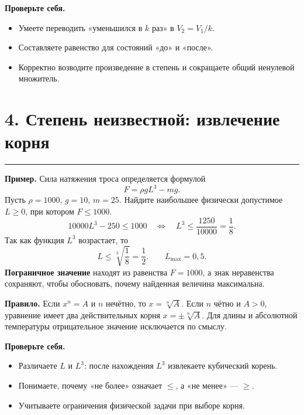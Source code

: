 \documentclass[a4paper,12pt]{article}
\newcommand{\sectionline}{\par\vspace{2pt}\noindent\textcolor{accent}{\rule{\linewidth}{0.5pt}}\par\vspace{3pt}}
\newcommand{\focus}[1]{\textbf{\textcolor{darkaccent}{#1}}}
\newcommand{\checklist}[1]{\par\smallskip\textcolor{darkaccent}{\textbf{Проверьте себя.}}\par\begin{itemize}[label=$\square$]#1\end{itemize}}
\begin{document}
\checklist{
\item Умеете переводить «уменьшился в \(k\) раз» в \(V_2=V_1/k\).
\item Составляете равенство для состояний «до» и «после».
\item Корректно возводите произведение в степень и сокращаете общий ненулевой множитель.
}

\section*{4. Степень неизвестной: извлечение корня}
\sectionline
\textbf{Пример.} Сила натяжения троса определяется формулой
\[
F=\rho gL^3-mg.
\]
Пусть \(\rho=1000\), \(g=10\), \(m=25\). Найдите наибольшее физически допустимое \(L\ge0\), при котором \(F\le1000\).
\[
10000L^3-250\le1000
\quad\Longleftrightarrow\quad L^3\le\frac{1250}{10000}=\frac18.
\]
Так как функция \(L^3\) возрастает, то
\[
L\le\sqrt[3]{\frac18}=\frac12.
\qquad\boxed{L_{\max}=0{,}5}.
\]
\focus{Пограничное значение} находят из равенства \(F=1000\), а знак неравенства сохраняют, чтобы обосновать, почему найденная величина максимальна.

\textbf{Правило.} Если \(x^n=A\) и \(n\) нечётно, то \(x=\sqrt[n]{A}\). Если \(n\) чётно и \(A>0\), уравнение имеет два действительных корня \(x=\pm\sqrt[n]{A}\). Для длины и абсолютной температуры отрицательное значение исключается по смыслу.

\checklist{
\item Различаете \(L\) и \(L^3\): после нахождения \(L^3\) извлекаете кубический корень.
\item Понимаете, почему «не более» означает \(\le\), а «не менее» --- \(\ge\).
\item Учитываете ограничения физической задачи при выборе корня.
}

\clearpage
\end{document}
